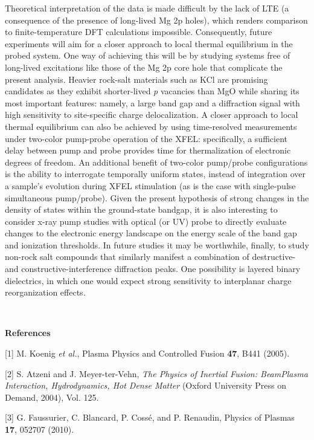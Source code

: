 Theoretical interpretation of the data is made difficult by the lack of
LTE (a consequence of the presence of long-lived Mg 2p holes), which
renders comparison to finite-temperature DFT calculations impossible.
Consequently, future experiments will aim for a closer approach to local
thermal equilibrium in the probed system. One way of achieving this will
be by studying systems free of long-lived excitations like those of the
Mg 2p core hole that complicate the present analysis. Heavier rock-salt
materials such as KCl are promising candidates as they exhibit
shorter-lived \emph{p} vacancies than MgO while sharing its most
important features: namely, a large band gap and a diffraction signal
with high sensitivity to site-specific charge delocalization. A closer
approach to local thermal equilibrium can also be achieved by using
time-resolved measurements under two-color pump-probe operation of the
XFEL: specifically, a sufficient delay between pump and probe provides
time for thermalization of electronic degrees of freedom. An additional
benefit of two-color pump/probe configurations is the ability to
interrogate temporally uniform states, instead of integration over a
sample's evolution during XFEL stimulation (as is the case with
single-pulse simultaneous pump/probe). Given the present hypothesis of
strong changes in the density of states within the ground-state bandgap,
it is also interesting to consider x-ray pump studies with optical (or
UV) probe to directly evaluate changes to the electronic energy
landscape on the energy scale of the band gap and ionization thresholds.
In future studies it may be worthwhile, finally, to study non-rock salt
compounds that similarly manifest a combination of destructive- and
constructive-interference diffraction peaks. One possibility is layered
binary dielectrics, in which one would expect strong sensitivity to
interplanar charge reorganization effects.

\textbf{\\}

\textbf{References}

{[}1{]} M. Koenig \emph{et al.}, Plasma Physics and Controlled Fusion
\textbf{47}, B441 (2005).

{[}2{]} S. Atzeni and J. Meyer-ter-Vehn, \emph{The Physics of Inertial
Fusion: BeamPlasma Interaction, Hydrodynamics, Hot Dense Matter} (Oxford
University Press on Demand, 2004), Vol. 125.

{[}3{]} G. Faussurier, C. Blancard, P. Cossé, and P. Renaudin, Physics
of Plasmas \textbf{17}, 052707 (2010).

